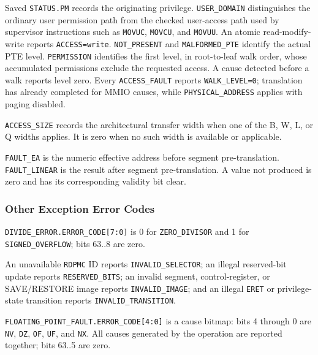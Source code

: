 



Saved \texttt{STATUS.PM} records the originating privilege. \texttt{USER\_DOMAIN} distinguishes the ordinary user
permission path from the checked user-access path used
by supervisor instructions such as \texttt{MOVUC}, \texttt{MOVCU}, and \texttt{MOVUU}. An atomic read-modify-write
reports \texttt{ACCESS=write}. \texttt{NOT\_PRESENT} and \texttt{MALFORMED\_PTE} identify the actual PTE level.
\texttt{PERMISSION} identifies the first level, in root-to-leaf walk order, whose accumulated permissions exclude the
requested access. A cause detected before a walk reports level zero.
Every \texttt{ACCESS\_FAULT} reports \texttt{WALK\_LEVEL=0}; translation has
already completed for MMIO causes, while \texttt{PHYSICAL\_ADDRESS} applies
with paging disabled.

\texttt{ACCESS\_SIZE} records the architectural transfer width when one of the B, W, L, or Q widths applies. It is
zero when no such width is available or applicable.

\texttt{FAULT\_EA} is the numeric effective address before segment pre-translation. \texttt{FAULT\_LINEAR} is the
result after segment pre-translation. A value not produced is zero and has its corresponding validity bit clear.

\subsubsection{Other Exception Error Codes}
\texttt{DIVIDE\_ERROR.ERROR\_CODE[7:0]} is 0 for \texttt{ZERO\_DIVISOR} and 1 for
\texttt{SIGNED\_OVERFLOW}; bits 63..8 are zero.







An unavailable \texttt{RDPMC} ID reports \texttt{INVALID\_SELECTOR}; an illegal
reserved-bit update reports \texttt{RESERVED\_BITS}; an invalid segment,
control-register, or SAVE/RESTORE image reports \texttt{INVALID\_IMAGE}; and an
illegal \texttt{ERET} or privilege-state transition reports
\texttt{INVALID\_TRANSITION}.

\texttt{FLOATING\_POINT\_FAULT.ERROR\_CODE[4:0]} is a cause bitmap: bits 4 through 0 are \texttt{NV},
\texttt{DZ}, \texttt{OF}, \texttt{UF}, and \texttt{NX}. All causes generated by the operation are reported together;
bits 63..5 are zero.

